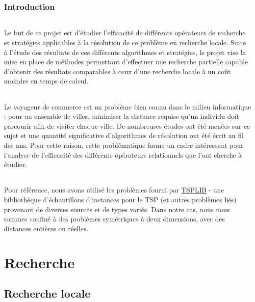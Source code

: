 \documentclass[a4paper,10pt]{report}
\begin{document}
\section{Introduction}

\paragraph{} %
  Le but de ce projet est d'étudier l'efficacité de différents opérateurs de recherche et stratégies applicables
à la résolution de ce problème en recherche locale. Suite à l'étude des résultats de ces différents algorithmes
et stratégies, le projet vise la mise en place de méthodes permettant d'effectuer une recherche partielle capable
d'obtenir des résultats comparables à ceux d'une recherche locale à un coût moindre en temps de calcul.

\paragraph{}
  Le voyageur de commerce est un problème bien connu dans le milieu informatique : pour un ensemble de villes,
minimiser la distance requise qu'un individu doit parcourir afin de visiter chaque ville. De nombreuses études
ont été menées sur ce sujet et une quantité significative d'algorithmes de résolution ont été écrit au fil des
ans. Pour cette raison, cette problématique forme un cadre intéressant pour l'analyse de l'efficacité des différents
opérateurs relationnels que l'ont cherche à étudier.

\paragraph{} %
  Pour référence, nous avons utilisé les problèmes fourni par
\href{https://www.iwr.uni-heidelberg.de/groups/comopt/software/TSPLIB95/}{TSPLIB}
- une bibliothèque d'échantillons d'instances pour le TSP (et autres problèmes liés) provenant de diverses sources
et de types variés. Dans notre cas, nous nous sommes confiné à des problèmes symétriques à deux dimensions, avec des
distances entières ou réelles.


\part{Recherche}
\chapter{Recherche locale}
\end{document}
